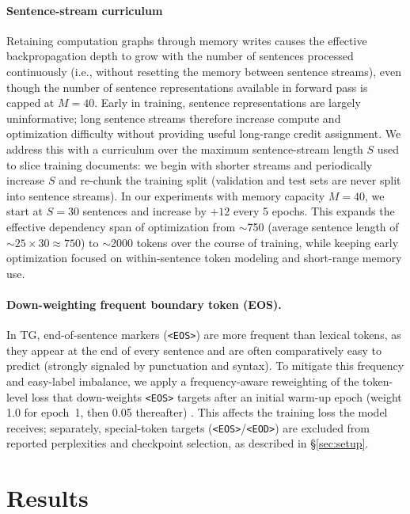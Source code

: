 \documentclass{article}
\begin{document}
\paragraph{Sentence-stream curriculum}
Retaining computation graphs through memory writes causes the effective backpropagation depth to grow with the number of sentences processed continuously (i.e., without resetting the memory between sentence streams), even though the number of sentence representations available in forward pass is capped at $M=40$. Early in training, sentence representations are largely uninformative; long sentence streams therefore increase compute and optimization difficulty without providing useful long-range credit assignment. We address this with a curriculum over the maximum sentence-stream length $S$ used to slice training documents: we begin with shorter streams and periodically increase $S$ and re-chunk the training split (validation and test sets are never split into sentence streams). In our experiments with memory capacity $M{=}40$, we start at $S{=}30$ sentences and increase by $+12$ every 5 epochs. This expands the effective dependency span of optimization from $\sim$750 (average sentence length of $\sim25{\times}30\!\approx\!750$)  to $\sim$2000 tokens over the course of training, while keeping early optimization focused on within-sentence token modeling and short-range memory use.



\paragraph{Down-weighting frequent boundary token (EOS).}
In TG, end-of-sentence markers (\texttt{<EOS>}) are more frequent than lexical tokens, as they appear at the end of every sentence and are often comparatively easy to predict (strongly signaled by punctuation and syntax). To mitigate this frequency and easy-label imbalance, we apply a frequency-aware reweighting of the token-level loss that down-weights \texttt{<EOS>} targets after an initial warm-up epoch (weight 1.0 for epoch~1, then 0.05 thereafter) \citep{lin2017focal,cui2019classbalanced}. This affects the training loss the model receives; separately, special-token targets (\texttt{<EOS>}/\texttt{<EOD>}) are excluded from reported perplexities and checkpoint selection, as described in \S\ref{sec:setup}. 



\section{Results}
\label{sec:results}
\end{document}

